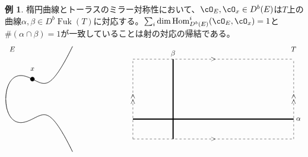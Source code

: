 \documentclass[uplatex,11pt,a4paper,dvipdfmx]{jsarticle}
\numberwithin{equation}{section}
\theoremstyle{definition}
\newtheorem{example}[theorem]{例}
\DeclareMathOperator{\Hom}{\mathrm{Hom}}
\DeclareMathOperator{\Fuk}{Fuk}
\begin{document}
\begin{example}
    楕円曲線とトーラスのミラー対称性において、$\cO_E, \cO_x \in D^b(E)$は$T$上の曲線$\alpha, \beta \in D^b \Fuk(T)$に対応する。$\sum_i \dim \Hom_{D^b(E)}^i(\cO_E, \cO_x)=1$と$\# (\alpha \cap \beta) = 1$が一致していることは射の対応の帰結である。
    \begin{displaymath}
        \begin{tikzpicture}[samples=300]
            \draw(-1, 2.5) node{$E$};
            \draw[thick,domain=-1.3247:2] plot(\x,{sqrt(\x^3-\x+1)});
            \draw[thick,domain=-1.3247:2] plot(\x,{-sqrt(\x^3-\x+1)});

            \filldraw[black] (0, 1) circle (3pt);
            \draw(0, 1.3) node[above]{$x$};

            \draw(13, 2.5) node{$T$};
            \draw[dashed] (5,-2)--(13,-2);
            \draw(9, -2) node{$>$};
            \draw[dashed] (5,2)--(13,2);
            \draw(9, 2) node{$>$};


            \draw[dashed] (5,-2)--(5,2);
            \draw(5, 0) node{\rotatebox{90}{$>>$}};
            \draw[dashed] (13,-2)--(13,2);
            \draw(13, 0) node{\rotatebox{90}{$>>$}};


            \draw[ultra thick] (5, -1)--(13, -1);
            \draw(13, -1) node[right]{$\alpha$};


            \draw[ultra thick] (7, -2)--(7, 2);
            \draw(7, 2) node[above]{$\beta$};
        \end{tikzpicture}
        \begin{tikzpicture}[scale=0.5]

        \end{tikzpicture}
    \end{displaymath}
\end{example}
\end{document}
